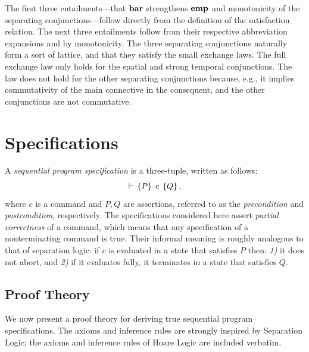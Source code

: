 \documentclass[11pt]{report}
\begin{document}
The first three entailments---that $\mathbf{bar}$ strengthens $\mathbf{emp}$ and monotonicity of the separating conjunctions---follow directly from the definition of the satisfaction relation. The next three entailments follow from their respective abbreviation expansions and by monotonicity. The three separating conjunctions naturally form a sort of lattice, and that they satisfy the small exchange laws. The full exchange law only holds for the spatial and strong temporal conjunctions. The law does not hold for the other separating conjunctions because, e.g., it implies commutativity of the main connective in the consequent, and the other conjunctions are not commutative. 


\section{Specifications}
\label{sec:sequential-specifications}

A \emph{sequential program specification} is a three-tuple, written as follows: \[ \vdash\,\left\lbrace P \right\rbrace\;c\;\left\lbrace Q \right\rbrace, \] where $c$ is a command and $P,Q$ are assertions, referred to as the \emph{precondition} and \emph{postcondition}, respectively. The specifications considered here assert \emph{partial correctness} of a command, which means that any specification of a nonterminating command is true. Their informal meaning is roughly analogous to that of separation logic: if $c$ is evaluated in a state that satisfies $P$ then: \emph{1)} it does not abort, and \emph{2)} if it evaluates fully, it terminates in a state that satisfies $Q$. 

\subsection{Proof Theory}
\label{sec:sequential-proof-theory}

We now present a proof theory for deriving true sequential program specifications. The axioms and inference rules are strongly inspired by Separation Logic; the axioms and inference rules of Hoare Logic are included verbatim. 
\end{document}
